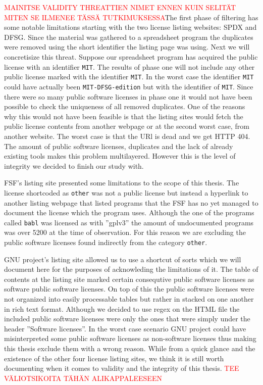 \textcolor{red}{MAINITSE VALIDITY THREATTIEN NIMET ENNEN KUIN SELITÄT MITEN SE ILMENEE TÄSSÄ TUTKIMUKSESSA}The first phase of filtering has some notable limitations starting with the two license listing websites: SPDX and DFSG. Since the material was gathered to a spreadsheet program the duplicates were removed using the short identifier the listing page was using. Next we will concretisize this threat. Suppose our spreadsheet program has acquired the public license with an identifier \texttt{MIT}. The results of phase one will not include any other public license marked with the identifier \texttt{MIT}. In the worst case the identifier \texttt{MIT} could have actually been \texttt{MIT-DFSG-edition} but with the identifier of \texttt{MIT}.  Since there were so many public software licenses in phase one it would not have been possible to check the uniqueness of all removed duplicates. One of the reasons why this would not have been feasible is that the listing sites would fetch the public license contents from another webpage or at the second worst case, from another website. The worst case is that the URl is dead and we get HTTP 404. The amount of public software licenses, duplicates and the lack of already existing tools makes this problem multilayered. However this is the level of integrity we decided to finish our study with.

FSF's listing site presented some limitations to the scope of this thesis. The license shortcoded as \texttt{other} was not a public license but instead a hyperlink to another listing webpage that listed programs that the FSF has no yet managed to document the license which the program uses. Although the one of the programs called \texttt{babl} was licensed as with ''gplv3'' the amount of undocumented programs was over 5200 at the time of observation. For this reason we are excluding the public software licenses found indirectly from the category \texttt{other}.

GNU project's listing site allowed us to use a shortcut of sorts which we will document here for the purposes of acknowleding the limitations of it. The table of contents at the listing site marked certain consequtive public software licenses as software public software licenses. On top of this the public software licenses were not organized into easily processable tables but rather in stacked on one another in rich text format. Although we decided to use regex on the HTML file the included public software licenses were only the ones that were simply under the header ''Software licenses''. In the worst case scenario GNU project could have misinterpreted some public software licenses as non-software licenses thus making this thesis exclude them with a wrong reason. While from a quick glance and the existence of the other four license listing sites, we think it is still worth documenting when it comes to validity and the integrity of this thesis. \textcolor{red}{TEE VÄLIOTSIKOITA TÄHÄN ALIKAPPALEESEEN}

